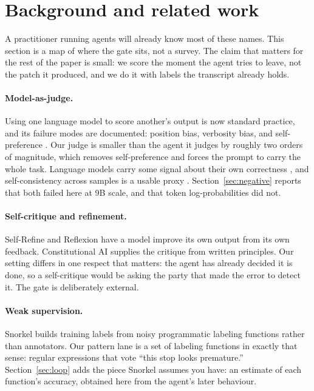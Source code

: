 \section{Background and related work}
\label{sec:related}

A practitioner running agents will already know most of these names.
This section is a map of where the gate sits, not a survey. The claim
that matters for the rest of the paper is small: we score the moment
the agent tries to leave, not the patch it produced, and we do it with
labels the transcript already holds.

\paragraph{Model-as-judge.} Using one language model to score another's output
is now standard practice, and its failure modes are documented: position bias,
verbosity bias, and self-preference \cite{zheng2023judging}. Our judge is
smaller than the agent it judges by roughly two orders of magnitude, which
removes self-preference and forces the prompt to carry the whole task.
Language models carry some signal about their own correctness
\cite{kadavath2022know}, and self-consistency across samples is a usable
proxy \cite{wang2022selfconsistency}. Section~\ref{sec:negative} reports that
both failed here at 9B scale, and that token log-probabilities did not.

\paragraph{Self-critique and refinement.} Self-Refine \cite{madaan2023selfrefine}
and Reflexion \cite{shinn2023reflexion} have a model improve its own output
from its own feedback. Constitutional AI \cite{bai2022constitutional} supplies
the critique from written principles. Our setting differs in one respect that
matters: the agent has already decided it is done, so a self-critique would be
asking the party that made the error to detect it. The gate is deliberately
external.

\paragraph{Weak supervision.} Snorkel \cite{ratner2017snorkel} builds training
labels from noisy programmatic labeling functions rather than annotators. Our
pattern lane is a set of labeling functions in exactly that sense:
regular expressions that vote ``this stop looks premature.''
Section~\ref{sec:loop} adds the piece Snorkel assumes you have: an estimate of
each function's accuracy, obtained here from the agent's later behaviour.

